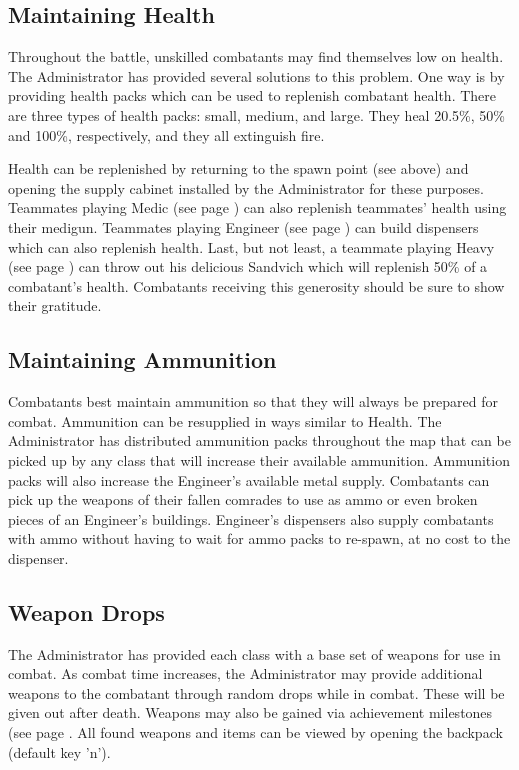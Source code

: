\subsection{Maintaining Health}
\label{Maintaining_Health}
Throughout the battle, unskilled combatants may find themselves low on health. The Administrator has provided several solutions to this problem. One way is by providing health packs which can be used to replenish combatant health. There are three types of health packs: small, medium, and large. They heal 20.5\%, 50\% and 100\%, respectively, and they all extinguish fire.

Health can be replenished by returning to the spawn point (see above) and opening the supply cabinet installed by the Administrator for these purposes. Teammates playing Medic (see page \pageref{Medic}) can also replenish teammates' health using their medigun. Teammates playing Engineer (see page \pageref{Engineer}) can build dispensers which can also replenish health. Last, but not least, a teammate playing Heavy (see page \pageref{Heavy}) can throw out his delicious Sandvich which will replenish 50\% of a combatant's health. Combatants receiving this generosity should be sure to show their gratitude.

\subsection{Maintaining Ammunition}
\label{Maintaining_Ammunition}
Combatants best maintain ammunition so that they will always be prepared for combat.  Ammunition can be resupplied in ways similar to Health.  The Administrator has distributed ammunition packs throughout the map that can be picked up by any class that will increase their available ammunition.  Ammunition packs will also increase the Engineer's available metal supply. Combatants can pick up the weapons of their fallen comrades to use as ammo or even broken pieces of an Engineer's buildings.  Engineer's dispensers also supply combatants with ammo without having to wait for ammo packs to re-spawn, at no cost to the dispenser.

\subsection{Weapon Drops}
The Administrator has provided each class with a base set of weapons for use in combat.  As combat time increases, the Administrator may provide additional weapons to the combatant through random drops while in combat. These will be given out after death.  Weapons may also be gained via achievement milestones (see page \pageref{Achievements}. All found weapons and items can be viewed by opening the backpack (default key 'n'). 

